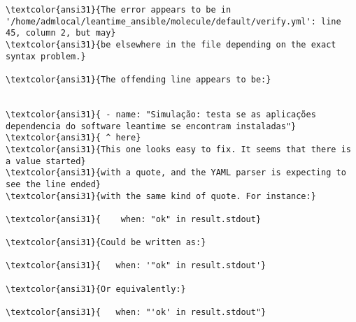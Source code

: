 \documentclass{scrartcl}
\begin{document}
\begin{Verbatim}
\textcolor{ansi31}{The error appears to be in '/home/admlocal/leantime_ansible/molecule/default/verify.yml': line 45, column 2, but may}
\textcolor{ansi31}{be elsewhere in the file depending on the exact syntax problem.}

\textcolor{ansi31}{The offending line appears to be:}


\textcolor{ansi31}{ - name: "Simulação: testa se as aplicações dependencia do software leantime se encontram instaladas"}
\textcolor{ansi31}{ ^ here}
\textcolor{ansi31}{This one looks easy to fix. It seems that there is a value started}
\textcolor{ansi31}{with a quote, and the YAML parser is expecting to see the line ended}
\textcolor{ansi31}{with the same kind of quote. For instance:}

\textcolor{ansi31}{    when: "ok" in result.stdout}

\textcolor{ansi31}{Could be written as:}

\textcolor{ansi31}{   when: '"ok" in result.stdout'}

\textcolor{ansi31}{Or equivalently:}

\textcolor{ansi31}{   when: "'ok' in result.stdout"}


\end{Verbatim}
\end{document}
